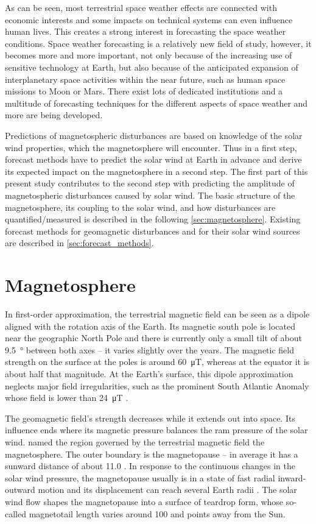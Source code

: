 As can be seen, most terrestrial space weather effects are connected with economic interests and some impacts on technical systems can even influence human lives. This creates a strong interest in forecasting the space weather conditions. Space weather forecasting is a relatively new field of study, however, it becomes more and more important, not only because of the increasing use of sensitive technology at Earth, but also because of the anticipated expansion of interplanetary space activities within the near future, such as human space missions to Moon or Mars. There exist lots of dedicated institutions and a multitude of forecasting techniques for the different aspects of space weather and more are being developed.

Predictions of magnetospheric disturbances are based on knowledge of the solar wind properties, which the magnetosphere will encounter. Thus in a first step, forecast methods have to predict the solar wind at Earth in advance and derive its expected impact on the magnetosphere in a second step. The first part of this present study contributes to the second step with predicting the amplitude of magnetospheric disturbances caused by solar wind. The basic structure of the magnetosphere, its coupling to the solar wind, and how disturbances are quantified/measured is described in the following \autoref{sec:magnetosphere}. Existing forecast methods for geomagnetic disturbances and for their solar wind sources are described in \autoref{sec:forecast_methods}.


\section{Magnetosphere}
\label{sec:magnetosphere}
In first-order approximation, the terrestrial magnetic field can be seen as a dipole aligned with the rotation axis of the Earth. Its magnetic south pole is located near the geographic North Pole and there is currently only a small tilt of about \SI{9.5}{\degree} between both axes \citep{Thebault2015} -- it varies slightly over the years. The magnetic field strength on the surface at the poles is around \SI{60}{\micro\tesla}, whereas at the equator it is about half that magnitude. At the Earth's surface, this dipole approximation neglects major field irregularities, such as the prominent South Atlantic Anomaly whose field is lower than \SI{24}{\micro\tesla} \citep{Thebault2015}.

The geomagnetic field's strength decreases while it extends out into space. Its influence ends where its magnetic pressure balances the ram pressure of the solar wind. \citet{Gold1959} named the region governed by the terrestrial magnetic field the magnetosphere. The outer boundary is the magnetopause -- in average it has a sunward distance of about \SI{11.0}{\RE} \citep{Fairfield1971}. In response to the continuous changes in the solar wind pressure, the magnetopause usually is in a state of fast radial inward-outward motion and its displacement can reach several Earth radii \citep{DeKeyser2005}. The solar wind flow shapes the magnetopause into a surface of teardrop form, whose so-called magnetotail length varies around \SI{100}{\RE} and points away from the Sun.

